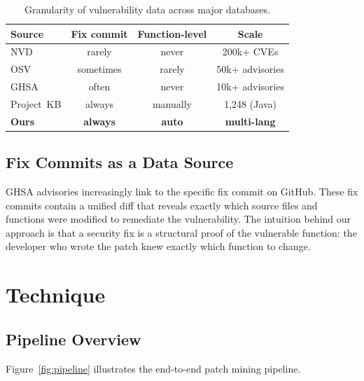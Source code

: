 \documentclass[sigconf,nonacm]{acmart}
\begin{document}
\begin{table}[t]
    \centering
    \caption{Granularity of vulnerability data across major databases.}
    \label{tab:db-comparison}
    \begin{tabular}{lccc}
        \toprule
        \textbf{Source} & \textbf{Fix commit} & \textbf{Function-level} & \textbf{Scale} \\
        \midrule
        NVD        & rarely   & never    & 200k+ CVEs \\
        OSV        & sometimes & rarely  & 50k+ advisories \\
        GHSA       & often    & never    & 10k+ advisories \\
        Project~KB & always   & manually & 1{,}248 (Java) \\
        \textbf{Ours} & \textbf{always} & \textbf{auto} & \textbf{multi-lang} \\
        \bottomrule
    \end{tabular}
\end{table}

\subsection{Fix Commits as a Data Source}

GHSA advisories increasingly link to the specific fix commit on GitHub.
These fix commits contain a unified diff that reveals exactly which source
files and functions were modified to remediate the vulnerability.
The intuition behind our approach is that a security fix is a structural
proof of the vulnerable function: the developer who wrote the patch knew
exactly which function to change.

\section{Technique}
\label{sec:technique}

\subsection{Pipeline Overview}

Figure~\ref{fig:pipeline} illustrates the end-to-end patch mining pipeline.
\end{document}
